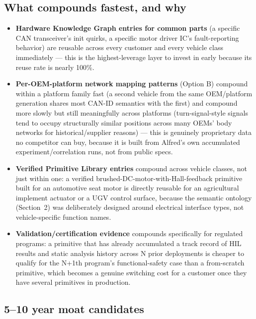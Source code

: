 \subsection{What compounds fastest, and why}

\begin{itemize}
\item \textbf{Hardware Knowledge Graph entries for common parts} (a specific CAN transceiver's init quirks, a specific motor driver IC's fault-reporting behavior) are reusable across every customer and every vehicle class immediately --- this is the highest-leverage layer to invest in early because its reuse rate is nearly 100\%.
\item \textbf{Per-OEM-platform network mapping patterns} (Option B) compound within a platform family fast (a second vehicle from the same OEM/platform generation shares most CAN-ID semantics with the first) and compound more slowly but still meaningfully across platforms (turn-signal-style signals tend to occupy structurally similar positions across many OEMs' body networks for historical/supplier reasons) --- this is genuinely proprietary data no competitor can buy, because it is built from Alfred's own accumulated experiment/correlation runs, not from public specs.
\item \textbf{Verified Primitive Library entries} compound across vehicle classes, not just within one: a verified brushed-DC-motor-with-Hall-feedback primitive built for an automotive seat motor is directly reusable for an agricultural implement actuator or a UGV control surface, because the semantic ontology (Section~2) was deliberately designed around electrical interface types, not vehicle-specific function names.
\item \textbf{Validation/certification evidence} compounds specifically for regulated programs: a primitive that has already accumulated a track record of HIL results and static analysis history across N prior deployments is cheaper to qualify for the N+1th program's functional-safety case than a from-scratch primitive, which becomes a genuine switching cost for a customer once they have several primitives in production.
\end{itemize}

\subsection{5--10 year moat candidates}

